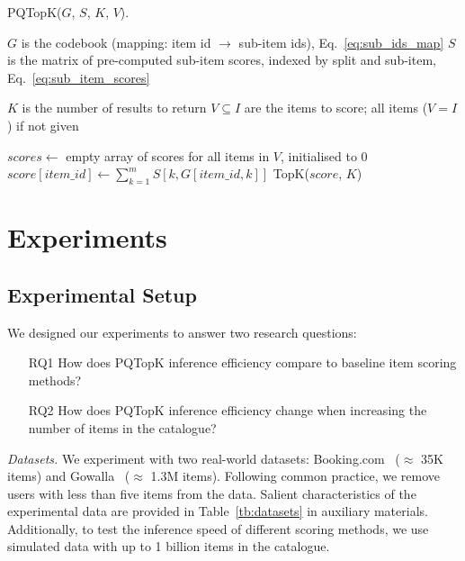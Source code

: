 \documentclass[sigconf,natbib=true, review=true]{acmart} %
\begin{document}
\begin{algorithm}[h]
\small
\caption{PQTopK($G$, $S$, $K$, $V$).}\label{alg:top_k}
\begin{algorithmic}[1]
   \Require $G$ is the codebook (mapping: item id $\rightarrow$ sub-item ids), Eq.~\eqref{eq:sub_ids_map}
   \Require $S$ is the matrix of pre-computed sub-item scores, indexed by split and sub-item, Eq.~\eqref{eq:sub_item_scores}

   \Require $K$ is the number of results to return
   \Require $V \subseteq I$ are the items to score; all items ($V = I$)  if not given 
   
   \State $scores \gets$ empty array of scores for all items in $V$, initialised to 0
    \label{alg:outer_loop} 
        \State $score[item\_id] \gets \sum_{k=1}^{m} S[k,G[item\_id,k]] \label{alg:inner_loop} $ 
   \EndFor
   \State \Return TopK($score$, $K$)  
\end{algorithmic}
\end{algorithm}


\section{Experiments}\label{sec:experiments}
\subsection{Experimental Setup}
We designed our experiments to answer two research questions: 
\begin{itemize}
    \item[RQ1] How does PQTopK inference efficiency compare to baseline item scoring methods? 
    \item[RQ2] How does PQTopK inference efficiency change when increasing the number of items in the catalogue? 
\end{itemize}

\textit{Datasets.} We experiment with two real-world datasets: Booking.com~\cite{goldenberg_bookingcom_2021}  ($\approx$ 35K items) and Gowalla~\cite{choFriendshipMobilityUser2011} ($\approx$ 1.3M items). Following common practice, we remove users with less than five items from the data. Salient characteristics of the experimental data are provided in Table~\ref{tb:datasets} in auxiliary materials. Additionally, to test the inference speed of different scoring methods, we use simulated data with up to 1 billion items in the catalogue. 
\end{document}
